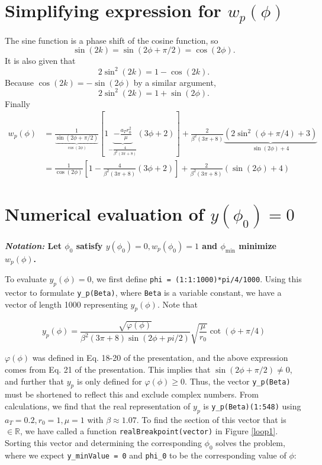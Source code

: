 \section{Simplifying expression for \texorpdfstring{$w_p(\phi)$}{}}

The sine function is a phase shift of the cosine function, so 
\begin{equation}
    \sin(2k)=\sin(2\phi+\pi/2)=\cos(2\phi).
\end{equation}
It is also given that
\begin{equation}
    2\sin^2(2k)=1-\cos(2k).
\end{equation}
Because $\cos(2k)=-\sin(2\phi)$ by a similar argument, 
\begin{equation}
    2\sin^2(2k)=1+\sin(2\phi).
\end{equation}
Finally
\begin{align}
    w_p(\phi)&=\frac{1}{\underbrace{\sin(2\phi+\pi/2)}_{\cos(2\phi)}}[1\underbrace{-\frac{a_Tr_0^2}{\mu}}_{-\frac{4}{\beta^2(3\pi+8)}}(3\phi+2)]+\frac{2}{\beta^2(3\pi+8)}\underbrace{(2\sin^2(\phi+\pi/4)+3)}_{\sin(2\phi)+4}\\
    &=\frac{1}{\cos(2\phi)}\left[1-\frac{4}{\beta^2(3\pi+8)}(3\phi+2)\right]+\frac{2}{\beta^2(3\pi+8)}(\sin(2\phi)+4)
\end{align}

\section{Numerical evaluation of \texorpdfstring{$y(\phi_0)=0$}{}}

\textbf{\textit{Notation:} Let $\phi_0$ satisfy $y(\phi_0)=0,w_p(\phi_0)=1$ and $\phi_\mathrm{min}$ minimize $w_p(\phi)$.}

To evaluate $y_p(\phi)=0$, we first define \verb|phi = (1:1:1000)*pi/4/1000|. 
Using this vector to formulate \verb|y_p(Beta)|, where \verb|Beta| is a variable constant, we have a vector of length 1000 representing $y_p(\phi)$.
Note that

\begin{equation}
    y_p(\phi)=\frac{\sqrt{\varphi(\phi)}}{\beta^2(3\pi+8)\sin(2\phi+pi/2)}\sqrt{\frac{\mu}{r_0}}\cot(\phi+\pi/4)
\end{equation}

$\varphi(\phi)$ was defined in Eq. 18-20 of the presentation, and the above expression comes from Eq. 21 of the presentation. This implies that $\sin(2\phi+\pi/2)\neq 0$, and further that $y_p$ is only defined for $\varphi(\phi)\geq 0$. Thus, the vector \verb|y_p(Beta)| must be shortened to reflect this and exclude complex numbers.
From calculations, we find that the real representation of $y_p$ is \verb|y_p(Beta)(1:548)| using $a_T=0.2,r_0=1,\mu=1$ with $\beta\approx 1.07$.
To find the section of this vector that is $\in \mathbb{R}$, we have called a function \verb|realBreakpoint(vector)| in Figure \ref{loop1}.
Sorting this vector and determining the corresponding $\phi_0$ solves the problem, where we expect \verb|y_minValue = 0| and \verb|phi_0| to be the corresponding value of $\phi$:

